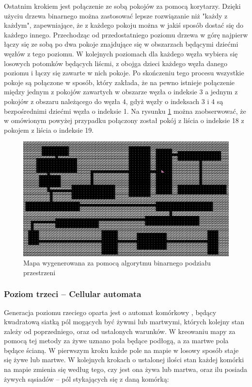 \documentclass[12pt,twoside]{article}
\begin{document}
Ostatnim krokiem jest połączenie ze sobą pokojów za pomocą korytarzy. Dzięki użyciu drzewa binarnego można zastosować lepsze rozwiązanie niż "każdy z każdym", zapewniające, że z każdego pokoju można w jakiś sposób dostać się do każdego innego. Przechodząc od przedostatniego poziomu drzewa w górę najpierw łączy się ze sobą po dwa pokoje znajdujące się w obszarzach będącymi dziećmi węzłów z tego poziomu. W kolejnych poziomach dla każdego węzła wybiera się losowych potomków będących liścmi, z obojga dzieci każdego węzła danego poziomu i łączy się zawarte w nich pokoje. Po skończeniu tego procesu wszystkie pokoje są połączone w sposób, który zakłada, że na pewno istnieje połączenie między jednym z pokojów zawartych w obszarze węzła o indeksie 3 a jednym z pokojów z obszaru należącego do węzła 4, gdyż węzły o indeksach 3 i 4 są bezpośrednimi dziećmi węzła o indeksie 1. Na rysunku \ref{generators:bsp_done} można zaobserwować, że w omówionym powyżej przypadku połączony został pokój z liścia o indeksie 18 z pokojem z liścia o indeksie 19.

\FloatBarrier
\begin{figure}[h]
	\centering
	\includegraphics[width=12cm]{images/generators/bsp_done.png}
	\caption{Mapa wygenerowana za pomocą algorytmu binarnego podziału przestrzeni}
	\label{generators:bsp_done}
\end{figure}
\FloatBarrier


\subsubsection{Poziom trzeci -- Cellular automata}
Generacja poziomu rzeciego oparta jest o automat komórkowy \cite{book_ca}, będący kwadratową siatką pól mogących być żywmi lub martwymi, których kolejny stan zależy od poprzedniego, oraz od ustalonych warunków. W kreowaniu mapy za pomocą tej metody za żywe uznano pola będące podłogą, a za martwe pola będące ścianą. W pierwszym kroku każde pole na mapie w losowy sposób staje się żywe lub martwe. W kolejnych krokach o ustalonej ilości stan każdej komórki na mapie zmienia się według tego, czy jest ona żywa lub martwa, oraz ilu posiada żywych sąsiadów -- pól stykających się z daną komórką:
\end{document}
